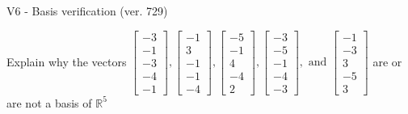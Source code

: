 \begin{exercise}
  \begin{exerciseTitle}V6 - Basis verification (ver. 729)\end{exerciseTitle}
  \begin{exerciseStatement}
    Explain why the vectors \(\left[\begin{array}{r}
-3 \\
-1 \\
-3 \\
-4 \\
-1
\end{array}\right] , \left[\begin{array}{r}
-1 \\
3 \\
-1 \\
-1 \\
-4
\end{array}\right] , \left[\begin{array}{r}
-5 \\
-1 \\
4 \\
-4 \\
2
\end{array}\right] , \left[\begin{array}{r}
-3 \\
-5 \\
-1 \\
-4 \\
-3
\end{array}\right] , \text{ and } \left[\begin{array}{r}
-1 \\
-3 \\
3 \\
-5 \\
3
\end{array}\right]\) are or are not a basis of \(\mathbb{R}^5\)	



\end{exerciseStatement}
\end{exercise}
